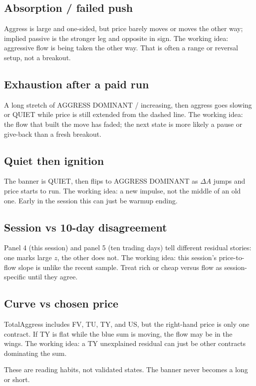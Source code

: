 \documentclass[11pt]{article}
\begin{document}
\subsection{Absorption / failed push}

Aggress is large and one-sided, but price barely moves or moves the
other way; implied passive is the stronger leg and opposite in sign.
The working idea: aggressive flow is being taken the other way.  That
is often a range or reversal setup, not a breakout.

\subsection{Exhaustion after a paid run}

A long stretch of AGGRESS DOMINANT / increasing, then aggress goes
slowing or QUIET while price is still extended from the dashed line.
The working idea: the flow that built the move has faded; the next
state is more likely a pause or give-back than a fresh breakout.

\subsection{Quiet then ignition}

The banner is QUIET, then flips to AGGRESS DOMINANT as \(\Delta A\)
jumps and price starts to run.  The working idea: a new impulse, not
the middle of an old one.  Early in the session this can just be
warmup ending.

\subsection{Session vs 10-day disagreement}

Panel 4 (this session) and panel 5 (ten trading days) tell different
residual stories: one marks large \(z\), the other does not.  The
working idea: this session's price-to-flow slope is unlike the recent
sample.  Treat rich or cheap versus flow as session-specific until they
agree.

\subsection{Curve vs chosen price}

TotalAggress includes FV, TU, TY, and US, but the right-hand price is
only one contract.  If TY is flat while the blue sum is moving, the
flow may be in the wings.  The working idea: a TY unexplained residual
can just be other contracts dominating the sum.

These are reading habits, not validated states.  The banner never
becomes a long or short.
\end{document}

